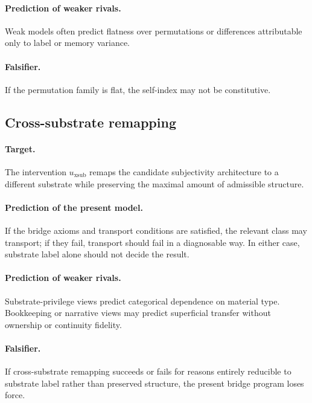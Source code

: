 \documentclass[11pt,a4paper]{article}
\theoremstyle{definition}
\begin{document}
\paragraph{Prediction of weaker rivals.} Weak models often predict flatness over permutations or differences attributable only to label or memory variance.

\paragraph{Falsifier.} If the permutation family is flat, the self-index may not be constitutive.

\subsection{Cross-substrate remapping}
\paragraph{Target.} The intervention $u_{\mathrm{xsub}}$ remaps the candidate subjectivity architecture to a different substrate while preserving the maximal amount of admissible structure.

\paragraph{Prediction of the present model.} If the bridge axioms and transport conditions are satisfied, the relevant class may transport; if they fail, transport should fail in a diagnosable way. In either case, substrate label alone should not decide the result.

\paragraph{Prediction of weaker rivals.} Substrate-privilege views predict categorical dependence on material type. Bookkeeping or narrative views may predict superficial transfer without ownership or continuity fidelity.

\paragraph{Falsifier.} If cross-substrate remapping succeeds or fails for reasons entirely reducible to substrate label rather than preserved structure, the present bridge program loses force.
\end{document}
